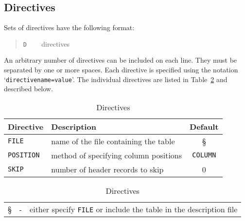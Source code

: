 \documentclass[twoside,11pt]{article}
\renewcommand{\_}{\texttt{\symbol{95}}}
\begin{document}
\subsection{Directives \label{DIR}}

Sets of directives have the following format:

\begin{quote}
{\tt D} ~~~ directives
\end{quote}

An arbitrary number of directives can be included on each line.  They
must be separated by one or more spaces.  Each directive is specified
using the notation `{\tt directive\_name=value}'.  The individual
directives are listed in Table~\ref{DIRECT} and described below.

\begin{table}[htbp]

\begin{center}
\begin{tabular}{llc}
Directive  & Description               & Default \\ \hline
{\tt FILE} & name of the file containing the table       & \S           \\
{\tt POSITION}   & method of specifying column positions & {\tt COLUMN} \\
{\tt SKIP} & number of header records to skip            & 0            \\
\end{tabular}

\vspace{1cm}

\begin{tabular}{rcl}
 \S        & - & either specify {\tt FILE} or include the table in the description file \\
\end{tabular}

\caption{Directives \label{DIRECT} }
\end{center}

\end{table}
\end{document}

